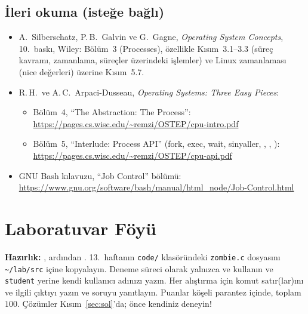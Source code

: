 \subsection*{İleri okuma (isteğe bağlı)}
\begin{itemize}
  \item A.\ Silberschatz, P.\,B.\ Galvin ve G.\ Gagne, \emph{Operating System Concepts}, 10.\ baskı, Wiley: Bölüm~3 (Processes), özellikle Kısım~3.1--3.3 (süreç kavramı, zamanlama, süreçler üzerindeki işlemler) ve Linux zamanlaması (nice değerleri) üzerine Kısım~5.7.
  \item R.\,H.\ ve A.\,C.\ Arpaci-Dusseau, \emph{Operating Systems: Three Easy Pieces}:
  \begin{itemize}
    \item Bölüm~4, ``The Abstraction: The Process'': \url{https://pages.cs.wisc.edu/~remzi/OSTEP/cpu-intro.pdf}
    \item Bölüm~5, ``Interlude: Process API'' (fork, exec, wait, sinyaller, , , ): \url{https://pages.cs.wisc.edu/~remzi/OSTEP/cpu-api.pdf}
  \end{itemize}
  \item GNU Bash kılavuzu, ``Job Control'' bölümü: \url{https://www.gnu.org/software/bash/manual/html_node/Job-Control.html}
\end{itemize}

\section{Laboratuvar Föyü}
\label{sec:lab}

\textbf{Hazırlık:} , ardından . 13.~haftanın \texttt{code/} klasöründeki \texttt{zombie.c} dosyasını \texttt{\textasciitilde/lab/src} içine kopyalayın. Deneme süreci olarak yalnızca  ve  kullanın ve \texttt{student} yerine kendi kullanıcı adınızı yazın. Her alıştırma için komut satır(lar)ını ve ilgili çıktıyı yazın ve soruyu yanıtlayın. Puanlar köşeli parantez içinde, toplam $100$. Çözümler Kısım~\ref{sec:sol}'da; önce kendiniz deneyin!

